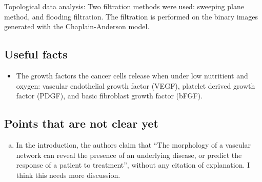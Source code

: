 Topological data analysis: Two filtration methods were used: sweeping plane method, and flooding filtration. The filtration is performed on the binary images generated with the Chaplain-Anderson model.


\subsection{Useful facts}
\begin{itemize}
	\item The growth factors the cancer cells release when under low nutritient and oxygen: vascular endothelial growth factor (VEGF), platelet derived growth factor (PDGF), and basic fibroblast growth factor (bFGF).
\end{itemize}

\subsection{Points that are not clear yet}
\begin{enumerate}[(a)]
	\item In the introduction, the authors claim that ``The morphology of a vascular network can reveal the presence of an underlying disease, or predict the response of a patient to treatment'', without any citation of explanation. I think this needs more discussion.
\end{enumerate}

